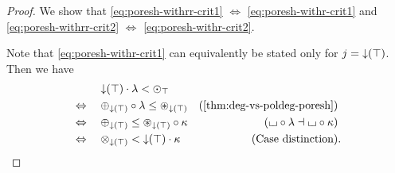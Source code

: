 \documentclass[a4paper]{memoir}
\begin{document}
\begin{proof}
	We show that \cref{eq:poresh-withrr-crit1} $\Leftrightarrow$ \cref{eq:poresh-withr-crit1} and \cref{eq:poresh-withrr-crit2} $\Leftrightarrow$ \cref{eq:poresh-withr-crit2}.
	
	Note that \cref{eq:poresh-withr-crit1} can equivalently be stated only for $j = {\downarrow}(\top)$. Then we have
	\begin{align*}
		&\quad\mathrel{\phantom{\Leftrightarrow}}\quad
		\predeg(\top) \cdot \lambda < \nonpol_\top
		\\ &\quad\Leftrightarrow\quad
		\pospol_{\predeg(\top)} \circ \lambda \leq \isopol_{\predeg(\top)}
		&\text{(\Cref{thm:deg-vs-poldeg-poresh})}
		\\ &\quad\Leftrightarrow\quad
		\pospol_{\predeg(\top)} \leq \isopol_{\predeg(\top)} \circ \kappa
		&\text{($\loch \circ \lambda \dashv \loch \circ \kappa$)}
		\\ &\quad\Leftrightarrow\quad
		\mixpol_{\predeg(\top)} < \predeg(\top) \cdot \kappa
		&\text{(Case distinction)} &.
	\end{align*}
	

\end{proof}
\end{document}
